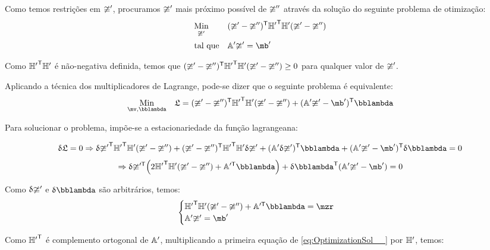 \documentclass[a4paper,11pt,brazil,fleqn]{article}
\begin{document}
\begin{itemize}
Como temos restri\c{c}\~oes em $\mathbb{\upsilon}'$, procuramos $\mathbb{\upsilon}'$ mais pr\'oximo poss\'ivel de $\mathbb{\upsilon}''$ atrav\'es da solu\c{c}\~ao do seguinte problema de otimiza\c{c}\~ao:
\begin{equation} \label{eq:Optimization__}
\begin{aligned}
& \underset{\mup'}{\text{Min}}
& & (\mup' - \mup'')^\msT {\mH'}^\msT \mH' (\mup' - \mup'') \\
& \text{tal que}
& & \mA' \mup'  = \mb'
\end{aligned}
\end{equation}

Como ${\mathbb{H}'}^{\mathsf{T}} \mathbb{H}'$ \'e n\~ao-negativa definida, temos que $(\mathbb{\upsilon}' - \mathbb{\upsilon}'')^{\mathsf{T}} {\mathbb{H}'}^{\mathsf{T}} \mathbb{H}' (\mathbb{\upsilon}' - \mathbb{\upsilon}'') \geq 0 $ para qualquer valor de $\mathbb{\upsilon}'$.

Aplicando a t\'ecnica dos multiplicadores de Lagrange, pode-se dizer que o seguinte problema \'e equivalente:
\begin{equation}
\begin{aligned}
& \underset{\mv, \mlambda}{\text{Min}}
& & \mathfrak{L} = (\mup' - \mup'')^\msT {\mH'}^\msT \mH' (\mup' - \mup'') + (\mA' \mup'  - \mb')^\msT \mlambda \\
\end{aligned}
\end{equation}


Para solucionar o problema, imp\~oe-se a estacionariedade da fun\c{c}\~ao lagrangeana:

$$ \dl \mathfrak{L} = 0 \Rightarrow \dl {\mup'}^\msT {\mH'}^\msT \mH' (\mup' - \mup'') + (\mup' - \mup'')^\msT {\mH'}^\msT \mH' \dl \mup' + (\mA' \dl \mup')^\msT \mlambda + (\mA' \mup'  - \mb')^\msT \dl \mlambda = 0 $$
$$ \Rightarrow \dl \mup'^\msT \Big( 2 {\mH'}^\msT \mH' (\mup' - \mup'') + \mA'^\msT \mlambda \Big) + \dl \mlambda^\msT (\mA' \mup' - \mb') = 0 $$

Como ${\updelta} \mathbb{\upsilon}'$ e $\dl \mlambda$ s\~ao arbitr\'arios, temos:
\begin{equation} \label{eq:OptimizationSol__}
\begin{cases}
{\mH'}^\msT \mH' (\mup' - \mup'') + \mA'^\msT \mlambda = \mzr \\
\mA' \mup'  = \mb'
\end{cases}
\end{equation}

Como ${\mathbb{H}'}^{\mathsf{T}}$ \'e complemento ortogonal de $\mathbb{A}'$, multiplicando a primeira equa\c{c}\~ao de \eqref{eq:OptimizationSol__} por $\mathbb{H}'$, temos: \\


\end{itemize}
\end{document}
